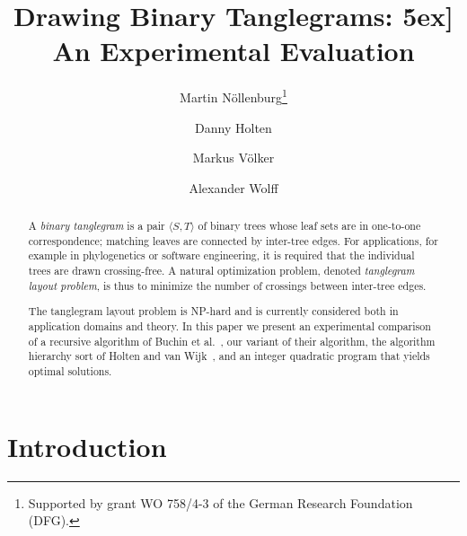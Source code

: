 \documentclass[runningheads,a4paper]{llncs}
\newcommand{\ttree}[1]{\ensuremath{\langle #1 \rangle}}
\begin{document}
\title{Drawing Binary Tanglegrams: \.5ex] \large An Experimental Evaluation}


\author{
Martin N\"ollenburg\thanks{Supported by grant WO 758/4-3 of
  the German Research Foundation (DFG).} \and Danny Holten \and Markus V\"olker \and Alexander Wolff
}


\maketitle

\begin{abstract}
  A \emph{binary tanglegram} is a pair \ttree{S,T} of binary trees
  whose leaf sets are in one-to-one correspondence; matching leaves
  are connected by inter-tree edges.  For applications, for example in
  phylogenetics or software engineering, it is required that the
  individual trees are drawn crossing-free. A natural optimization
  problem, denoted \emph{tanglegram layout problem}, is thus to
  minimize the number of crossings between inter-tree edges.

  The tanglegram layout problem is NP-hard and is currently considered
  both in application domains and theory.  In this paper we present an
  experimental comparison of a recursive algorithm of Buchin et
  al.~\cite{bbbnow-dbtha-08}, our variant of their algorithm, the
  algorithm hierarchy sort of Holten and van Wijk~\cite{hw-vchod-08},
  and an integer quadratic program that yields optimal solutions.
\end{abstract}

\section{Introduction}
\end{document}
